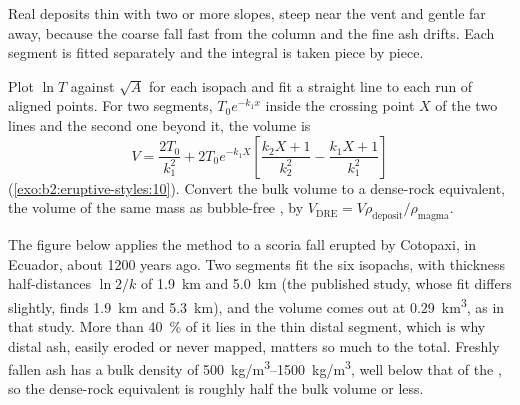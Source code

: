 Real deposits thin with two or more slopes, steep near the vent and gentle far
away, because the coarse  fall fast from the column and the fine ash
drifts. Each segment is fitted separately and the integral is taken piece by
piece.

\begin{method}\label{met:b2:eruptive-styles:volume}
Plot $\ln T$ against $\sqrt A$ for each isopach and fit a straight line to each
run of aligned points. For two segments, $T_0e^{-k_1x}$ inside the crossing point
$X$ of the two lines and the second one beyond it, the volume is
\[
V = \frac{2T_0}{k_1^2} + 2T_0e^{-k_1X}\left[\frac{k_2X + 1}{k_2^2} -
\frac{k_1X + 1}{k_1^2}\right]
\]
(\cref{exo:b2:eruptive-styles:10}). Convert the bulk volume to a dense-rock equivalent, the volume of
the same mass as bubble-free , by $V_{\mathrm{DRE}} = V\rho_{\mathrm{deposit}}/\rho_{\mathrm{magma}}$.
\end{method}

The figure below applies the method to a scoria fall erupted by Cotopaxi, in
Ecuador, about \num{1200} years ago. Two segments fit the six isopachs, with
thickness half-distances $\ln 2/k$ of \qty{1.9}{km} and \qty{5.0}{km} (the
published study, whose fit differs slightly, finds \qty{1.9}{km} and
\qty{5.3}{km}), and the volume comes out at \qty{0.29}{km^3}, as in that study. More than
\qty{40}{\percent} of it lies in the thin distal segment, which is why distal ash,
easily eroded or never mapped, matters so much to the total. Freshly fallen ash
has a bulk density of \qtyrange{500}{1500}{kg/m^3}, well below that of the
, so the dense-rock equivalent is roughly half the bulk volume or less.

